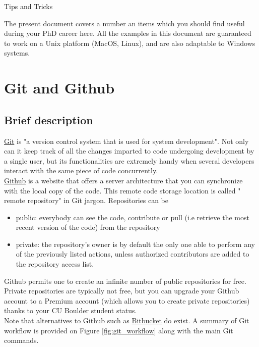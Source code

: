 \documentclass{report}
\makeatletter
\newcommand*{\toccontents}{\@starttoc{toc}}
\makeatother
\begin{document}
\begin{huge}
\begin{center}
Tips and Tricks
\end{center}
\end{huge}
The present document covers a number an items which you should find useful during your PhD career here. All the examples in this document are guaranteed to work on a Unix platform (MacOS, Linux), and are also adaptable to Windows systems.\\
\toccontents

\section{Git and Github}
\subsection{Brief description}
\href{https://en.wikipedia.org/wiki/Git_(software)}{Git} is "a version control system that is used for system development". Not only can it keep track of all the changes imparted to code undergoing development by a single user, but its functionalities are extremely handy when several developers interact with the same piece of code concurrently.\\
\href{https://github.com/}{Github} is a website that offers a server architecture that you can synchronize with the local copy of the code. This remote code storage location is called " remote repository" in Git jargon. Repositories can be
\begin{itemize}
\item public: everybody can see the code, contribute or pull (i.e retrieve the most recent version of the code) from the repository
\item private: the repository's owner is by default the only one able to perform any of the previously listed actions, unless authorized contributors are added to the repository access list.
\end{itemize} 
Github permits one to create an infinite number of public repositories for free. Private repositories are typically not free, but you can upgrade your Github account to a Premium account (which allows you to create private repositories) thanks to your CU Boulder student status.\\ Note that alternatives to Github such as \href{https://bitbucket.org}{Bitbucket}  do exist.
A summary of Git workflow is provided on Figure \ref{fig:git_workflow} along with the main Git commands.
\end{document}
